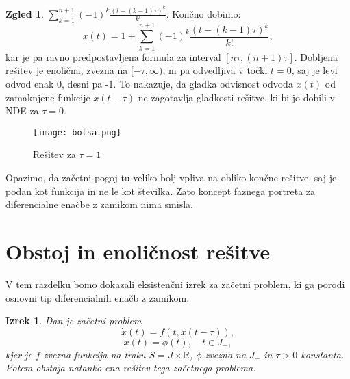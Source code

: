 \documentclass[12pt,a4paper]{amsart}
\theoremstyle{definition} %
\newtheorem{zgled}[definicija]{Zgled}
\theoremstyle{plain} %
\newtheorem{izrek}[definicija]{Izrek}
\newcommand{\R}{\mathbb R}
\begin{document}
\begin{zgled}
     $\sum_{k=1}^{n+1}(-1)^{k}\frac{(t-(k-1)\tau)^k}{k!}$. Končno dobimo:
     \[x(t) = 1+ \sum_{k=1}^{n+1}(-1)^{k}\frac{(t-(k-1)\tau)^k}{k!},\]
    kar je pa ravno predpostavljena formula za interval $[n\tau, (n+1)\tau].$
    Dobljena rešitev je enolična, zvezna na $[-\tau,\infty)$, ni pa odvedljiva v točki $t=0$, saj je 
    levi odvod enak 0, desni pa -1. To nakazuje, da gladka odvisnost odvoda $\dot{x}(t)$ od zamaknjene
    funkcije $x(t-\tau)$
    ne zagotavlja gladkosti rešitve, ki bi jo dobili
    v NDE za $\tau=0$. %
    \begin{figure}[h]
        \texttt{[image: bolsa.png]}
        \caption{Rešitev za $\tau=1$}
    \end{figure}
\end{zgled}
\noindent Opazimo, da začetni pogoj tu veliko bolj vpliva na obliko končne rešitve, saj je podan kot funkcija in 
ne le kot številka. Zato koncept faznega portreta za diferencialne enačbe z zamikom nima smisla.


\section{Obstoj in enoličnost rešitve}

V tem razdelku bomo dokazali eksistenčni izrek
za začetni problem, ki ga porodi osnovni tip diferencialnih enačb z zamikom.

\begin{izrek}
    Dan je začetni problem $$\dot{x}(t)=f(t,x(t-\tau)),$$
    $$x(t)=\phi(t),\quad t\in J_{-},$$ kjer je $f$ zvezna funkcija na traku $S=J \times \R$, $\phi$ zvezna na $J_{-}$ in $\tau >0$
    konstanta. Potem obstaja natanko ena rešitev tega začetnega problema.
\end{izrek}
\end{document}
